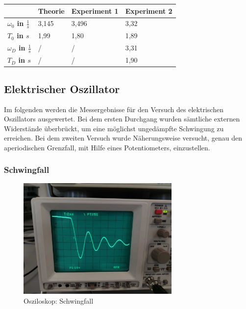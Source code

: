 \documentclass[a4paper]{scrartcl}
\numberwithin{equation}{subsection}
\begin{document}
\begin{table}[H]
\begin{tabular}{|l|l|l|l|}
\hline
 									& \textbf{Theorie} & \textbf{Experiment 1} & \textbf{Experiment 2} \\ \hline
\textbf{$\omega_0$ in $\frac{1}{s}$} & 3,145            & 3,496                 & 3,32       	         \\ \hline
\textbf{$T_0$ in $s$}                & 1,99             & 1,80                  & 1,89        			 \\ \hline
\textbf{$\omega_D$ in $\frac{1}{s}$} & /                & /                     & 3,31        			 \\ \hline
\textbf{$T_D$ in $s$}                & /                & /                     & 1,90        			 \\ \hline
\end{tabular}
\centering
\end{table}

\subsection{Elektrischer Oszillator}
Im folgenden werden die Messergebnisse für den Versuch des elektrischen Oszillators ausgewertet. Bei dem ersten Durchgang wurden sämtliche externen Widerstände überbrückt, um eine möglichst ungedämpfte Schwingung zu erreichen. Bei dem zweiten Versuch wurde Näherungsweise versucht, genau den aperiodischen Grenzfall, mit Hilfe eines Potentiometers, einzustellen.

\subsubsection{Schwingfall}

\begin{figure}[H]
\includegraphics[width=8cm]{Bild_Osziloskop-Schwingung}
\centering
\caption{Osziloskop: Schwingfall}
\centering
\end{figure}
\end{document}
